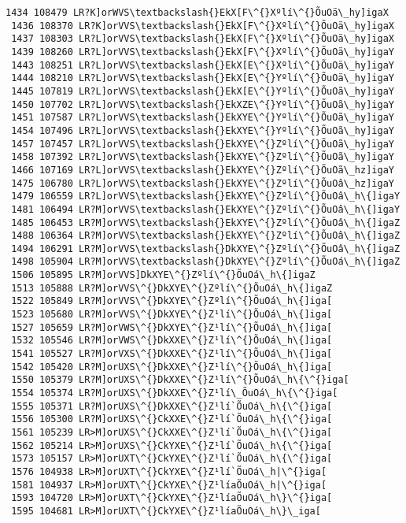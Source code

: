 \documentclass[11pt]{article}
\begin{document}
\begin{Verbatim}[commandchars=\\\{\}]
 1434 108479 LR?K]orWVS\textbackslash{}EkX[F\^{}Xºlí\^{}ÕuOä\_hy]igaX
 1436 108370 LR?K]orVVS\textbackslash{}EkX[F\^{}Xºlí\^{}ÕuOä\_hy]igaX
 1437 108303 LR?L]orVVS\textbackslash{}EkX[F\^{}Xºlí\^{}ÕuOä\_hy]igaX
 1439 108260 LR?L]orVVS\textbackslash{}EkX[F\^{}Xºlí\^{}ÕuOä\_hy]igaY
 1443 108251 LR?L]orVVS\textbackslash{}EkX[E\^{}Xºlí\^{}ÕuOä\_hy]igaY
 1444 108210 LR?L]orVVS\textbackslash{}EkX[E\^{}Yºlí\^{}ÕuOä\_hy]igaY
 1445 107819 LR?L]orVVS\textbackslash{}EkX[E\^{}Yºlí\^{}ÕuOã\_hy]igaY
 1450 107702 LR?L]orVVS\textbackslash{}EkXZE\^{}Yºlí\^{}ÕuOã\_hy]igaY
 1451 107587 LR?L]orVVS\textbackslash{}EkXYE\^{}Yºlí\^{}ÕuOã\_hy]igaY
 1454 107496 LR?L]orVVS\textbackslash{}EkXYE\^{}Yºlí\^{}ÕuOã\_hy]igaY
 1457 107457 LR?L]orVVS\textbackslash{}EkXYE\^{}Zºlí\^{}ÕuOã\_hy]igaY
 1458 107392 LR?L]orVVS\textbackslash{}EkXYE\^{}Zºlí\^{}ÕuOã\_hy]igaY
 1466 107169 LR?L]orVVS\textbackslash{}EkXYE\^{}Zºlí\^{}ÕuOã\_hz]igaY
 1475 106780 LR?L]orVVS\textbackslash{}EkXYE\^{}Zºlí\^{}ÕuOâ\_hz]igaY
 1479 106559 LR?L]orVVS\textbackslash{}EkXYE\^{}Zºlí\^{}ÕuOâ\_h\{]igaY
 1481 106494 LR?M]orVVS\textbackslash{}EkXYE\^{}Zºlí\^{}ÕuOâ\_h\{]igaY
 1485 106453 LR?M]orVVS\textbackslash{}EkXYE\^{}Zºlí\^{}ÕuOâ\_h\{]igaZ
 1488 106364 LR?M]orVVS\textbackslash{}EkXYE\^{}Zºlí\^{}ÕuOâ\_h\{]igaZ
 1494 106291 LR?M]orVVS\textbackslash{}DkXYE\^{}Zºlí\^{}ÕuOâ\_h\{]igaZ
 1498 105904 LR?M]orVVS\textbackslash{}DkXYE\^{}Zºlí\^{}ÕuOá\_h\{]igaZ
 1506 105895 LR?M]orVVS]DkXYE\^{}Zºlí\^{}ÕuOá\_h\{]igaZ
 1513 105888 LR?M]orVVS\^{}DkXYE\^{}Zºlí\^{}ÕuOá\_h\{]igaZ
 1522 105849 LR?M]orVVS\^{}DkXYE\^{}Zºlí\^{}ÕuOá\_h\{]iga[
 1523 105680 LR?M]orVVS\^{}DkXYE\^{}Z¹lí\^{}ÕuOá\_h\{]iga[
 1527 105659 LR?M]orVWS\^{}DkXYE\^{}Z¹lí\^{}ÕuOá\_h\{]iga[
 1532 105546 LR?M]orVWS\^{}DkXXE\^{}Z¹lí\^{}ÕuOá\_h\{]iga[
 1541 105527 LR?M]orVXS\^{}DkXXE\^{}Z¹lí\^{}ÕuOá\_h\{]iga[
 1542 105420 LR?M]orUXS\^{}DkXXE\^{}Z¹lí\^{}ÕuOá\_h\{]iga[
 1550 105379 LR?M]orUXS\^{}DkXXE\^{}Z¹lí\^{}ÕuOá\_h\{\^{}iga[
 1554 105374 LR?M]orUXS\^{}DkXXE\^{}Z¹lí\_ÕuOá\_h\{\^{}iga[
 1555 105371 LR?M]orUXS\^{}DkXXE\^{}Z¹lí`ÕuOá\_h\{\^{}iga[
 1556 105300 LR?M]orUXS\^{}CkXXE\^{}Z¹lí`ÕuOá\_h\{\^{}iga[
 1561 105239 LR>M]orUXS\^{}CkXXE\^{}Z¹lí`ÕuOá\_h\{\^{}iga[
 1562 105214 LR>M]orUXS\^{}CkYXE\^{}Z¹lí`ÕuOá\_h\{\^{}iga[
 1573 105157 LR>M]orUXT\^{}CkYXE\^{}Z¹lí`ÕuOá\_h\{\^{}iga[
 1576 104938 LR>M]orUXT\^{}CkYXE\^{}Z¹lí`ÕuOá\_h|\^{}iga[
 1581 104937 LR>M]orUXT\^{}CkYXE\^{}Z¹líaÕuOá\_h|\^{}iga[
 1593 104720 LR>M]orUXT\^{}CkYXE\^{}Z¹líaÕuOá\_h\}\^{}iga[
 1595 104681 LR>M]orUXT\^{}CkYXE\^{}Z¹líaÕuOá\_h\}\_iga[

\end{Verbatim}
\end{document}
